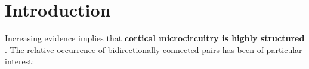 \section*{Introduction}

Increasing evidence implies that \textbf{cortical microcircuitry is highly structured} \cite{Song2005,Perin2011}.
%
The relative occurrence of bidirectionally connected pairs has been of particular interest: 
